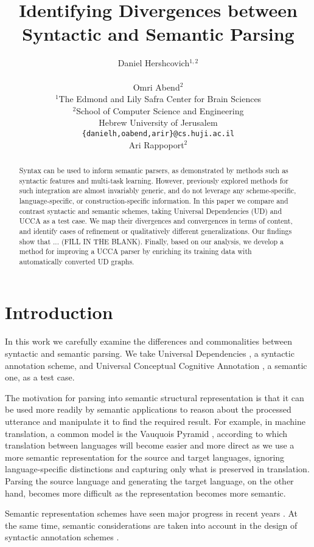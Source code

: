 \documentclass[11pt,a4paper]{article}
\title{Identifying Divergences between Syntactic and Semantic Parsing}
\author{Daniel Hershcovich$^{1,2}$ \\
  \\\And
  Omri Abend$^2$ \\
  $^1$The Edmond and Lily Safra Center for Brain Sciences \\
  $^2$School of Computer Science and Engineering \\
  Hebrew University of Jerusalem \\
  \texttt{\{danielh,oabend,arir\}@cs.huji.ac.il}
  \\\And
  Ari Rappoport$^2$
}
\date{}
\begin{document}
\maketitle

\begin{abstract}
Syntax can be used to inform semantic parsers, as demonstrated by
methods such as syntactic features and multi-task learning.
However, previously explored methods for such integration
are almost invariably generic, and do not leverage any
scheme-specific, language-specific, or
construction-specific information.
In this paper we compare and contrast syntactic and semantic schemes,
taking Universal Dependencies (UD) and UCCA as a test case.
We map their divergences and convergences in terms of content,
and identify cases of refinement or qualitatively different generalizations.
Our findings show that ... (FILL IN THE BLANK).
Finally, based on our analysis, we develop a method for improving a UCCA parser
by enriching its training data with automatically converted UD graphs.
\end{abstract}

\section{Introduction}\label{sec:introduction}

In this work we carefully examine the differences and commonalities
between syntactic and semantic parsing.
We take Universal Dependencies \cite[UD; ][]{nivre2016universal},
a syntactic annotation scheme,
and Universal Conceptual Cognitive Annotation \cite[UCCA; ][]{abend2013universal},
a semantic one, as a test case.

The motivation for parsing into semantic structural representation is that it can be used more readily
by semantic applications to reason about the processed utterance and manipulate it to find the required
result.
For example, in machine translation, a common model is the Vauquois Pyramid 
\cite{vauquois1968survey},
according to which translation between languages will become easier and more direct as we use
a more semantic representation for the source and target languages,
ignoring language-specific distinctions and capturing only what is preserved in translation.
Parsing the source language and generating the target language, on the other hand, becomes more
difficult as the representation becomes more semantic.

Semantic representation schemes have seen major progress in recent years \cite{abend2017state}.
At the same time, semantic considerations are taken into account in the design of syntactic annotation schemes
\cite{przepiorkowski2018arguments}.
\end{document}
